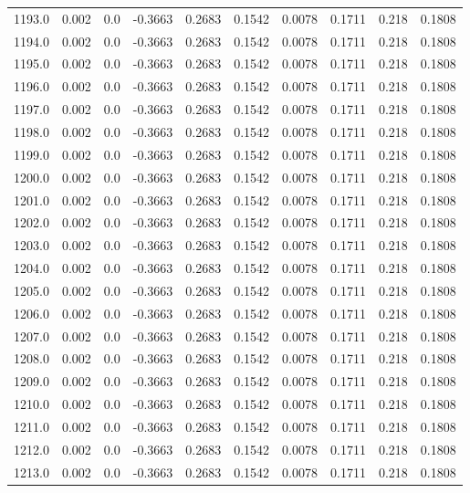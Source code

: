 \begin{longtable}{lrrrrrrrrr}
1193.0 & 0.002 & 0.0 & -0.3663 & 0.2683 & 0.1542 & 0.0078 & 0.1711 & 0.218 & 0.1808 \\
1194.0 & 0.002 & 0.0 & -0.3663 & 0.2683 & 0.1542 & 0.0078 & 0.1711 & 0.218 & 0.1808 \\
1195.0 & 0.002 & 0.0 & -0.3663 & 0.2683 & 0.1542 & 0.0078 & 0.1711 & 0.218 & 0.1808 \\
1196.0 & 0.002 & 0.0 & -0.3663 & 0.2683 & 0.1542 & 0.0078 & 0.1711 & 0.218 & 0.1808 \\
1197.0 & 0.002 & 0.0 & -0.3663 & 0.2683 & 0.1542 & 0.0078 & 0.1711 & 0.218 & 0.1808 \\
1198.0 & 0.002 & 0.0 & -0.3663 & 0.2683 & 0.1542 & 0.0078 & 0.1711 & 0.218 & 0.1808 \\
1199.0 & 0.002 & 0.0 & -0.3663 & 0.2683 & 0.1542 & 0.0078 & 0.1711 & 0.218 & 0.1808 \\
1200.0 & 0.002 & 0.0 & -0.3663 & 0.2683 & 0.1542 & 0.0078 & 0.1711 & 0.218 & 0.1808 \\
1201.0 & 0.002 & 0.0 & -0.3663 & 0.2683 & 0.1542 & 0.0078 & 0.1711 & 0.218 & 0.1808 \\
1202.0 & 0.002 & 0.0 & -0.3663 & 0.2683 & 0.1542 & 0.0078 & 0.1711 & 0.218 & 0.1808 \\
1203.0 & 0.002 & 0.0 & -0.3663 & 0.2683 & 0.1542 & 0.0078 & 0.1711 & 0.218 & 0.1808 \\
1204.0 & 0.002 & 0.0 & -0.3663 & 0.2683 & 0.1542 & 0.0078 & 0.1711 & 0.218 & 0.1808 \\
1205.0 & 0.002 & 0.0 & -0.3663 & 0.2683 & 0.1542 & 0.0078 & 0.1711 & 0.218 & 0.1808 \\
1206.0 & 0.002 & 0.0 & -0.3663 & 0.2683 & 0.1542 & 0.0078 & 0.1711 & 0.218 & 0.1808 \\
1207.0 & 0.002 & 0.0 & -0.3663 & 0.2683 & 0.1542 & 0.0078 & 0.1711 & 0.218 & 0.1808 \\
1208.0 & 0.002 & 0.0 & -0.3663 & 0.2683 & 0.1542 & 0.0078 & 0.1711 & 0.218 & 0.1808 \\
1209.0 & 0.002 & 0.0 & -0.3663 & 0.2683 & 0.1542 & 0.0078 & 0.1711 & 0.218 & 0.1808 \\
1210.0 & 0.002 & 0.0 & -0.3663 & 0.2683 & 0.1542 & 0.0078 & 0.1711 & 0.218 & 0.1808 \\
1211.0 & 0.002 & 0.0 & -0.3663 & 0.2683 & 0.1542 & 0.0078 & 0.1711 & 0.218 & 0.1808 \\
1212.0 & 0.002 & 0.0 & -0.3663 & 0.2683 & 0.1542 & 0.0078 & 0.1711 & 0.218 & 0.1808 \\
1213.0 & 0.002 & 0.0 & -0.3663 & 0.2683 & 0.1542 & 0.0078 & 0.1711 & 0.218 & 0.1808 \\

\end{longtable}
